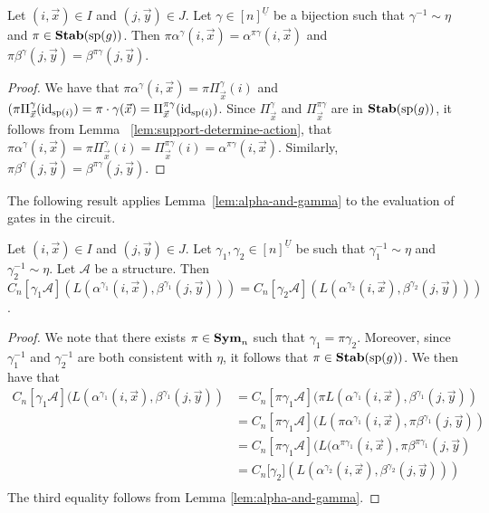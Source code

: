 \documentclass[../paper.tex]{subfiles}
\begin{document}
\begin{lem}
  \label{lem:alpha-and-gamma}
	Let $(i,\vec{x}) \in I$ and $(j, \vec{y}) \in J$. Let $\gamma \in
  [n]^{\underline{U}}$ be a bijection such that $\gamma^{-1} \sim \eta$ and $\pi
  \in \text{\textbf{Stab}} (\text{sp} (g))$. Then $\pi \alpha^{\gamma}(i, \vec{x}) = \alpha^{\pi
    \gamma}(i, \vec{x})$ and $\pi \beta^{\gamma}(j, \vec{y}) = \beta^{\pi
    \gamma}(j, \vec{y})$.
\end{lem}
\begin{proof}
	We have that $\pi \alpha^{\gamma}(i, \vec{x}) = \pi \Pi^{\gamma}_{\vec{x}}(i)$
  and $(\pi \Pi^{\gamma}_{\vec{x}}(\operatorname{id}_{\text{sp}(i)}) = \pi \cdot \gamma (\vec{x})
  = \Pi^{\pi \gamma}_{\vec{x}}(\operatorname{id}_{\text{sp}(i)})$. Since $\Pi^{\gamma}_{\vec{x}}$
  and $\Pi^{\pi \gamma}_{\vec{x}}$ are in $\text{\textbf{Stab}} (\text{sp} (g))$, it follows from Lemma
  ~\ref{lem:support-determine-action}, that $\pi \alpha^{\gamma}(i, \vec{x}) =
  \pi \Pi^{\gamma}_{\vec{x}} (i) = \Pi^{\pi \gamma}_{\vec{x}}(i) = \alpha^{\pi
    \gamma}(i, \vec{x})$. Similarly, $\pi \beta^{\gamma}(j, \vec{y}) =
  \beta^{\pi \gamma} (j, \vec{y})$.
\end{proof}

The following result applies Lemma~\ref{lem:alpha-and-gamma} to the evaluation
of gates in the circuit.

\begin{lem}
	\label{lem:alpha-ind-gamma}
	Let $(i,\vec{x}) \in I$ and $(j, \vec{y}) \in J$. Let $\gamma_1, \gamma_2 \in
  [n]^{\underline{U}}$ be such that $\gamma^{-1}_1 \sim \eta$ and $\gamma^{-1}_2
  \sim \eta$. Let $\mathcal{A}$ be a structure. Then $C_n[\gamma_1 \mathcal{A}]
  (L(\alpha^{\gamma_1}(i, \vec{x}), \beta^{\gamma_1}(j, \vec{y}))) =
  C_n[\gamma_2 \mathcal{A}] (L(\alpha^{\gamma_2}(i, \vec{x}),
  \beta^{\gamma_2}(j, \vec{y})))$.
\end{lem}
\begin{proof}
	We note that there exists $\pi \in \text{\textbf{Sym}}_n$ such that $\gamma_1 = \pi
  \gamma_2$. Moreover, since $\gamma^{-1}_1$ and $\gamma^{-1}_2$ are both
  consistent with $\eta$, it follows that $\pi \in \text{\textbf{Stab}} (\text{sp} (g))$. We then have
  that
	\begin{align*}
		C_n[\gamma_1 \mathcal{A}](L(\alpha^{\gamma_1}(i, \vec{x}), \beta^{\gamma_1}(j,
		\vec{y})) & = C_n[\pi \gamma_1 \mathcal{A}](\pi L(\alpha^{\gamma_1}(i, \vec{x}), 
                \beta^{\gamma_1}(j, \vec{y})) \\
		          & = C_n[\pi \gamma_1 \mathcal{A}](L(\pi                                
                \alpha^{\gamma_1}(i, \vec{x}), \pi \beta^{\gamma_1}(j, \vec{y}))\\
		          & = C_n[\pi                                                            
                \gamma_1 \mathcal{A}](L(\alpha^{\pi \gamma_1}(i, \vec{x}), \pi \beta^{\pi
                \gamma_1}(j, \vec{y})\\
		          & = C_n[\gamma_2 \mathcal] (L(\alpha^{\gamma_2}(i,                     
                \vec{x}), \beta^{\gamma_2}(j, \vec{y})))\\
	\end{align*}The third equality follows from Lemma \ref{lem:alpha-and-gamma}.
\end{proof}
\end{document}
